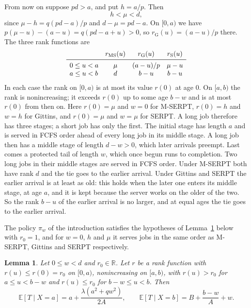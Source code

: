 \documentclass[11pt]{amsart}
\newtheorem{lemma}[theorem]{Lemma}
\theoremstyle{remark}
\numberwithin{equation}{section}
\newcommand{\E}{\mathbb{E}}
\begin{document}
From now on suppose $pd>a$, and put $h=a/p$. Then
\[
h<\mu<d,
\]
since $\mu-h=q(pd-a)/p$ and $d-\mu=pd-a$. On $[0,a)$ we have
$p(\mu-u)-(a-u)=q(pd-a+u)>0$, so $r_{\mathrm G}(u)=(a-u)/p$ there. The three
rank functions are
\[
\begin{array}{lccc}
 & r_{\mathrm{MS}}(u) & r_{\mathrm G}(u) & r_{\mathrm S}(u)\\ \midrule
0\le u<a & \mu & (a-u)/p & \mu-u\\
a\le u<b & d & b-u & b-u
\end{array}
\]
In each case the rank on $[0,a)$ is at most its value $r(0)$ at age $0$.
On $[a,b)$ the rank is nonincreasing; it exceeds $r(0)$ up to some age $b-w$
and is at most $r(0)$ from then on. Here $r(0)=\mu$ and $w=0$ for M-SERPT,
$r(0)=h$ and $w=h$ for Gittins, and $r(0)=\mu$ and $w=\mu$ for SERPT.
A long job therefore has three stages; a short job has only the first. The initial stage has length $a$ and is
served in FCFS order ahead of every long job in its middle stage. A long job then has a middle
stage of length $d-w>0$, which later arrivals preempt. Last comes a
protected tail of length $w$, which once begun runs to completion.
Two long jobs in their middle stages are served in FCFS order. Under
M-SERPT both have rank $d$ and the tie goes to the earlier arrival. Under
Gittins and SERPT the earlier arrival is at least as old: this holds when
the later one enters its middle stage, at age $a$, and it is kept because
the server works on the older of the two. So the rank $b-u$ of the earlier
arrival is no larger, and at equal ages the tie goes to the earlier arrival.

The policy $\pi_w$ of the introduction satisfies
the hypotheses of Lemma~\ref{lem:means} below with $r_0=1$, and for
$w=0$, $h$ and $\mu$ it serves jobs in the same order as M-SERPT, Gittins
and SERPT respectively.

\begin{lemma}\label{lem:means}
Let $0\le w<d$ and $r_0\in\mathbb R$. Let $r$ be a rank function with $r(u)\le r(0)=r_0$
on $[0,a)$, nonincreasing on $[a,b)$, with $r(u)>r_0$ for $a\le u<b-w$ and
$r(u)\le r_0$ for $b-w\le u<b$. Then
\[
\E[T\mid X=a]=a+\frac{\lambda(a^2+qw^2)}{2A},\qquad
\E[T\mid X=b]=B+\frac{b-w}{A}+w .
\]
\end{lemma}
\end{document}
